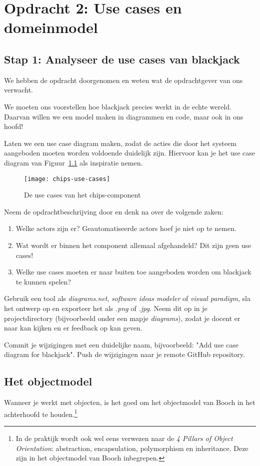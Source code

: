 \chapter{Opdracht 2: Use cases en domeinmodel}

\section{Stap 1: Analyseer de use cases van blackjack}
We hebben de opdracht doorgenomen en weten wat de opdrachtgever van ons verwacht.

We moeten ons voorstellen hoe blackjack precies werkt in de echte wereld.
Daarvan willen we een model maken in diagrammen en code, maar ook in ons hoofd!

Laten we een use case diagram maken, zodat de acties die door het systeem
aangeboden moeten worden voldoende duidelijk zijn. Hiervoor kan je het use case 
diagram van Figuur~\ref{fig:chips-use-cases} als inspiratie nemen.

\begin{figure}[H]
    \centering
    \texttt{[image: chips-use-cases]}
    \caption{De use cases van het chips-component}
    \label{fig:chips-use-cases}
\end{figure}

Neem de opdrachtbeschrijving door en denk na over de volgende zaken:
\begin{enumerate}
    \item Welke actors zijn er? Geautomatiseerde actors hoef je niet op te nemen.
    \item Wat wordt er binnen het component allemaal afgehandeld? Dit zijn geen use cases!
    \item Welke use cases moeten er naar buiten toe aangeboden worden om blackjack te kunnen spelen?
\end{enumerate}

Gebruik een tool als \textit{diagrams.net}, \textit{software ideas modeler} of \textit{visual paradigm},
sla het ontwerp op en exporteer het als \textit{.png} of \textit{.jpg}. 
Neem dit op in je projectdirectory (bijvoorbeeld onder een mapje \textit{diagrams}),
zodat je docent er naar kan kijken en er feedback op kan geven.

Commit je wijzigingen met een duidelijke naam, 
bijvoorbeeld: "Add use case diagram for blackjack". 
Push de wijzigingen naar je remote GitHub repository.

\section{Het objectmodel}
Wanneer je werkt met objecten, is het goed om het objectmodel van Booch in 
het achterhoofd te houden.\footnote{
    In de praktijk wordt ook wel eens verwezen naar de \textit{4 Pillars of Object Orientation}: 
    abstraction, encapsulation, polymorphism en inheritance. 
    Deze zijn in het objectmodel van Booch inbegrepen.
}

